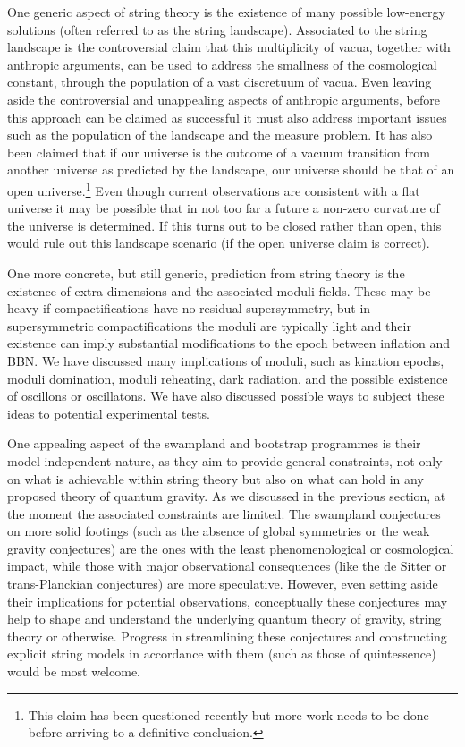 One generic aspect of string theory is the existence of many possible low-energy solutions (often referred to as the string landscape). Associated to the string landscape is the controversial claim that this multiplicity of vacua, together with anthropic arguments, can be used to address the smallness of the cosmological constant, through the population of a vast discretuum of vacua.  Even leaving aside the controversial and unappealing aspects of anthropic arguments, before this approach can be claimed as successful it must also address important issues such as the population of the landscape and the measure problem. It has also been claimed that if our universe is the outcome of a vacuum transition from another universe as predicted by the landscape,  our universe should be that of an open universe.\footnote{This claim has been questioned recently \cite{Hawking:2017wrd,Cespedes:2020xpn}  but more work needs to be done before arriving to a definitive conclusion.} Even though current observations are consistent with a flat universe it may be possible that in not too far a future a non-zero curvature of the universe is determined. If this turns out to be closed rather than open, this would rule out this landscape scenario (if the open universe claim is correct).

One more concrete, but still generic, prediction from string theory is the existence of extra dimensions and the associated moduli fields. These may be heavy if compactifications have no residual supersymmetry, but in supersymmetric compactifications the moduli are typically light and their existence can imply substantial modifications to the epoch between inflation and BBN. We have discussed many implications of moduli, such as
 kination epochs, moduli domination, moduli reheating, dark radiation, and the possible existence of oscillons or oscillatons. We have also discussed possible ways to subject these ideas to potential experimental tests.

One appealing aspect of the swampland and bootstrap programmes is their model independent nature, as they aim to provide general 
constraints, not only on what is achievable within string theory but also on what can hold in any proposed theory of quantum gravity. As we discussed in the previous section, at the moment the associated constraints are limited.  The swampland conjectures on more solid footings 
(such as the absence of global symmetries or the weak gravity conjectures) are the ones with the least phenomenological or cosmological impact, while those with major observational consequences (like the de Sitter or trans-Planckian conjectures) are more speculative. However, even setting aside their implications for potential observations, conceptually these conjectures may help to shape and understand the underlying quantum theory of gravity, string theory or otherwise.  Progress in streamlining these conjectures and constructing
explicit string models in accordance with them (such as those of quintessence) would be most welcome.

